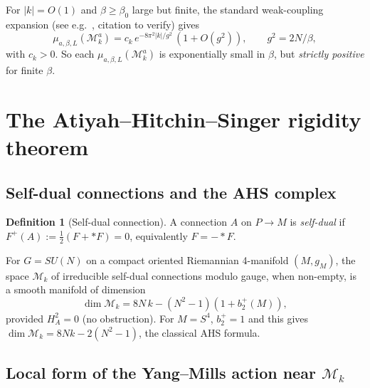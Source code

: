 \documentclass[11pt,a4paper]{amsart}
\theoremstyle{definition}
\newtheorem{definition}[theorem]{Definition}
\newcommand{\Mmod}{\mathcal{M}}
\begin{document}
For $|k|=O(1)$ and $\beta\geq\beta_0$ large but finite, the standard
weak-coupling expansion (see e.g.~\cite{LuscherTopo1998}, citation to
verify) gives
\begin{equation}\label{eq:topo-mass}
\mu_{a,\beta,L}(\Mmod_k^a) = c_k\,e^{-8\pi^2 |k|/g^2}
\,(1+O(g^2)),\qquad g^2 = 2N/\beta,
\end{equation}
with $c_k > 0$. So each $\mu_{a,\beta,L}(\Mmod_k^a)$ is exponentially
small in $\beta$, but \emph{strictly positive} for finite $\beta$.

\section{The Atiyah--Hitchin--Singer rigidity theorem}\label{sec:AHS}

\subsection{Self-dual connections and the AHS complex}

\begin{definition}[Self-dual connection]\label{def:SD}
A connection $A$ on $P\to M$ is \emph{self-dual} if
$F^+(A) := \tfrac{1}{2}(F + \ast F) = 0$, equivalently $F = -\ast F$.
\end{definition}

For $G=SU(N)$ on a compact oriented Riemannian 4-manifold $(M,g_M)$,
the space $\Mmod_k$ of irreducible self-dual connections modulo gauge,
when non-empty, is a smooth manifold of dimension
\begin{equation}\label{eq:dim-Mk}
\dim \Mmod_k = 8N\,k - (N^2-1)(1 + b^+_2(M)),
\end{equation}
provided $H^2_A = 0$ (no obstruction). For $M=S^4$, $b^+_2=1$ and this
gives $\dim\Mmod_k = 8Nk - 2(N^2-1)$, the classical AHS formula.

\subsection{Local form of the Yang--Mills action near $\Mmod_k$}
\end{document}
